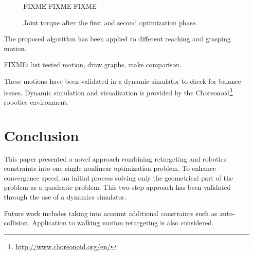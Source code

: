 \documentclass[letterpaper, 10 pt, conference]{ieeeconf}  %
\begin{document}
\begin{figure}[htbp!]
  FIXME FIXME FIXME
  \label{fig:results-torque}
  \caption{Joint torque after the first and second optimization
    phase.}
\end{figure}



The proposed algorithm has been applied to different reaching and
grasping motion.


FIXME: list tested motion, draw graphs, make comparison.


These motions have been validated in a dynamic simulator to check for
balance issues. Dynamic simulation and visualization is provided by
the Choreonoid\footnote{\url{http://www.choreonoid.org/en/}} robotics
environment.



\section{Conclusion}
\label{sec:conclusion}

This paper presented a novel approach combining retargeting and
robotics constraints into one single nonlinear optimization
problem. To enhance convergence speed, an initial process solving only
the geometrical part of the problem as a quadratic problem. This
two-step approach has been validated through the use of a dynamics
simulator.

Future work includes taking into account additional constraints such
as auto-collision. Application to walking motion retargeting is also
considered.





\end{document}
